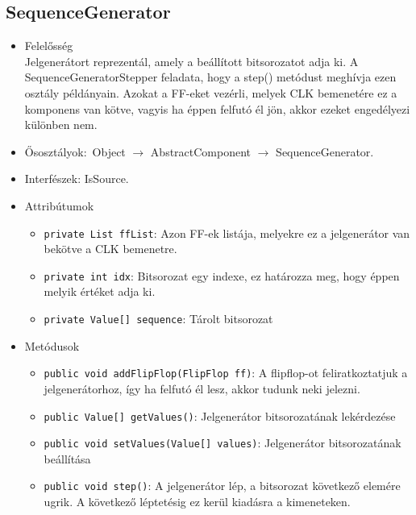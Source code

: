 \subsection{SequenceGenerator}
\begin{itemize}
\item Felelősség\\
Jelgenerátort reprezentál, amely a beállított bitsorozatot adja ki. A  SequenceGeneratorStepper feladata, hogy a step() metódust meghívja ezen osztály  példányain. Azokat a FF-eket vezérli, melyek CLK bemenetére ez a komponens van kötve,  vagyis ha éppen felfutó él jön, akkor ezeket engedélyezi különben nem.
\item Ősosztályok:\ Object $\rightarrow{}$ AbstractComponent $\rightarrow{}$ SequenceGenerator.
\item Interfészek: IsSource.
\item Attribútumok $\ $
\begin{itemize}
	\item \texttt{private List ffList}: Azon FF-ek listája, melyekre ez a jelgenerátor van bekötve a CLK bemenetre.
	\item \texttt{private int idx}: Bitsorozat egy indexe, ez határozza meg, hogy éppen melyik értéket adja ki.
	\item \texttt{private Value[] sequence}: Tárolt bitsorozat
\end{itemize}
\item Metódusok$\ $
\begin{itemize}
	\item \texttt{public void addFlipFlop(FlipFlop ff)}: A flipflop-ot feliratkoztatjuk a jelgenerátorhoz, így ha felfutó él lesz,  akkor tudunk neki jelezni.
	\item \texttt{public Value[] getValues()}: Jelgenerátor bitsorozatának lekérdezése
	\item \texttt{public void setValues(Value[] values)}: Jelgenerátor bitsorozatának beállítása
	\item \texttt{public void step()}: A jelgenerátor lép, a bitsorozat következő elemére ugrik. A következő léptetésig  ez kerül kiadásra a kimeneteken.
\end{itemize}
\end{itemize}

